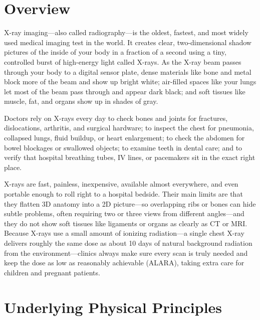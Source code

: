 \label{ch:infographic-xray}

\section{Overview}

X-ray imaging---also called radiography---is the oldest, fastest, and most widely used medical imaging test in the world. It creates clear, two-dimensional shadow pictures of the inside of your body in a fraction of a second using a tiny, controlled burst of high-energy light called X-rays. As the X-ray beam passes through your body to a digital sensor plate, dense materials like bone and metal block more of the beam and show up bright white; air-filled spaces like your lungs let most of the beam pass through and appear dark black; and soft tissues like muscle, fat, and organs show up in shades of gray.

Doctors rely on X-rays every day to check bones and joints for fractures, dislocations, arthritis, and surgical hardware; to inspect the chest for pneumonia, collapsed lungs, fluid buildup, or heart enlargement; to check the abdomen for bowel blockages or swallowed objects; to examine teeth in dental care; and to verify that hospital breathing tubes, IV lines, or pacemakers sit in the exact right place.

X-rays are fast, painless, inexpensive, available almost everywhere, and even portable enough to roll right to a hospital bedside. Their main limits are that they flatten 3D anatomy into a 2D picture---so overlapping ribs or bones can hide subtle problems, often requiring two or three views from different angles---and they do not show soft tissues like ligaments or organs as clearly as CT or MRI. Because X-rays use a small amount of ionizing radiation---a single chest X-ray delivers roughly the same dose as about 10 days of natural background radiation from the environment---clinics always make sure every scan is truly needed and keep the dose as low as reasonably achievable (ALARA), taking extra care for children and pregnant patients.

\section{Underlying Physical Principles}

